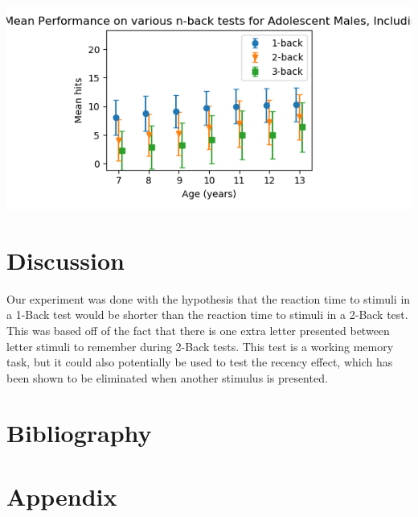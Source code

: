 \documentclass{article}
\begin{document}
\begin{center}
\includegraphics[width=.9\linewidth]{./pyplot2.png}
\end{center}







\section{Discussion}
\label{sec:org3460640}

Our experiment was done with the hypothesis that the reaction time to stimuli in a 1-Back test would be shorter than the reaction time to stimuli in a 2-Back test. This was based off of the fact that there is one extra letter presented between letter stimuli to remember during 2-Back tests. This test is a working memory task, but it could also potentially be used to test the recency effect, which has been shown to be eliminated when another stimulus is presented. \cite{cohen1989effects}
\section{Bibliography}
\label{sec:org3661a13}



\section{Appendix}
\label{sec:org98e1a86}
\end{document}
